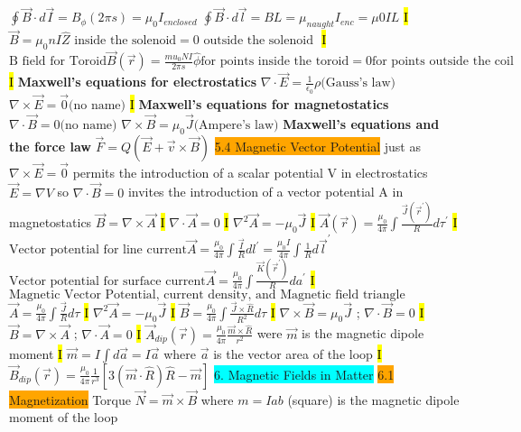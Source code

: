 \documentclass[fontsize=4pt]{scrartcl}
\begin{document}
$\oint \vec{B} \cdot d\vec{I} = B_{\phi} (2\pi s) = \mu_{0} I_{enclosed}$
$\oint \vec{B} \cdot d\vec{l} = BL = \mu_{naught} I_{enc} = \mu{0} I L$
\hl{I}
$\vec{B} = \mu_0 n I \hat{Z} \text{ inside the solenoid} = 0 \text{ outside the solenoid }$
\hl{I}
$\text{B field for Toroid} \vec{B}(\vec{r}) = \frac{mu_{0}NI}{2 \pi s} \hat{\phi} \text{for points inside the toroid} = 0 \text{for points outside the coil }$
\hl{I}
\textbf{Maxwell's equations for electrostatics} 
$\nabla \cdot \vec{E} = \frac{1}{\epsilon_0}\rho \text{(Gauss's law)}$
$\nabla \times \vec{E} = \vec{0} \text{(no name)}$
\hl{I}
\textbf{Maxwell's equations for magnetostatics}
$\nabla \cdot \vec{B} = 0  \text{(no name)}$
$\nabla \times \vec{B} = \mu_{0} \vec{J} \text{(Ampere's law)}$ 
\textbf{Maxwell's equations and the force law}
$\vec{F} = Q(\vec{E} + \vec{v} \times \vec{B})$
\colorbox{Orange}{5.4 Magnetic Vector Potential}
just as $\nabla \times \vec{E} = \vec{0}$ permits the introduction of a scalar potential V in electrostatics $\vec{E} = \nabla V$ so $\nabla \cdot \vec{B} = 0$ invites the introduction of a vector  potential A in magnetostatics $\vec{B} = \nabla \times \vec{A}$
\hl{I}
$\nabla \cdot \vec{A} = 0$
\hl{I}
$\nabla^2 \vec{A} = -\mu_0 \vec{J}$
\hl{I}
$\vec{A}(\vec{r}) = \frac{\mu_0}{4\pi}\int \frac{\vec{J}(\vec{r}^{\prime})}{R}d\tau^{\prime}$
\hl{I}
$\text{Vector potential for line current} \vec{A}= \frac{\mu_0}{4\pi} \int \frac{\vec{I}}{R} dl^{\prime} = \frac{\mu_0 I}{4\pi} \int \frac{1}{R}d\vec{l}^{\prime}$
$\text{Vector potential for surface current} 
\vec{A}= \frac{\mu_0}{4\pi} \int \frac{\vec{K}(\vec{r}^{\prime})}{R}da^{\prime} $
\hl{I}
$\text{Magnetic Vector Potential, current density, and Magnetic field triangle relationships} $
$\vec{A} = \frac{\mu_0}{4\pi} \int \frac{\vec{J}}{R}d\tau$
\hl{I}
$\nabla^2 \vec{A} = -\mu_0 \vec{J}$
\hl{I}
$\vec{B} = \frac{\mu_{0}}{4\pi} \int \frac{\vec{J} \times \hat{R}}{R^2} d\tau$
\hl{I}
$\nabla \times \vec{B} = \mu_0 \vec{J}$ ; $\nabla \cdot \vec{B} = 0$
\hl{I}
$\vec{B} = \nabla \times \vec{A}$ ; $\nabla \cdot \vec{A} = 0$
\hl{I}
$\vec{A}_{dip}(\vec{r}) = \frac{\mu_0}{4\pi}\frac{\vec{m} \times \hat{R}}{r^2}$
were $\vec{m}$ is the magnetic dipole moment
\hl{I}
$\vec{m} = I \int d \vec{a} = I \vec{a}$
where $\vec{a}$ is the vector area of the loop 
\hl{I}
$\vec{B}_{dip}(\vec{r}) = \frac{\mu_0}{4\pi}\frac{1}{r^3}[3(\vec{m} \cdot \hat{R})\hat{R} - \vec{m}]$
\colorbox{Cyan}{6. Magnetic Fields in Matter}
\colorbox{Orange}{6.1 Magnetization}
Torque $\vec{N} = \vec{m} \times \vec{B}$ where $m = Iab$ (square) is the magnetic dipole moment of the loop
\end{document}

